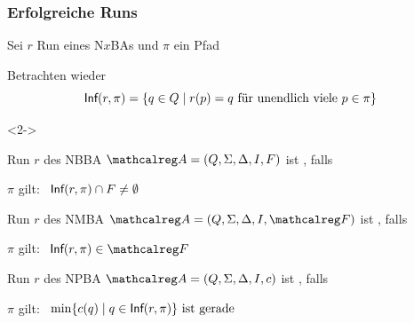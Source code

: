 \begin{frame}
  \frametitle{Erfolgreiche Runs}

  Sei $r$ Run eines N$x$BAs  %
  und $\pi$ ein Pfad

  \par\smallskip
  Betrachten wieder 
  \[
    \textsf{Inf}(r,\pi) = \{q \in Q \mid r(p) = q \text{~für unendlich viele~} p \in \pi\}
  \]

  \par
  \begin{Definition}<2->      
    \begin{Itemize}
      \item
        Run $r$ des NBBA $\Aut{A}=(Q,\Sigma,\Delta,I,F)$ ist , falls
        \par\smallskip
         $\pi$ gilt:~ $\textsf{Inf}(r,\pi) \cap F \neq \emptyset$
        \par\smallskip
      \item<3->
        Run $r$ des NMBA $\Aut{A}=(Q,\Sigma,\Delta,I,\calF)$ ist , falls
        \par\smallskip
         $\pi$ gilt:~ $\Inf(r,\pi) \in \calF$
        \par\smallskip
      \item<4->
        Run $r$ des NPBA $\Aut{A}=(Q,\Sigma,\Delta,I,c)$ ist , falls
        \par\smallskip
         $\pi$ gilt:~ 
        $
          \min\{c(q) \mid q \in \textsf{Inf}(r,\pi)\} \text{~ist gerade}
        $
    \end{Itemize}

  \end{Definition}

\end{frame}


